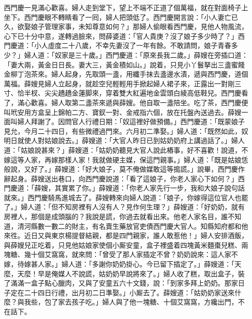 西門慶一見滿心歡喜。婦人走到堂下，望上不端不正道了個萬福，就在對面椅子上坐下。西門慶眼不轉睛看了一囘，婦人把頭低了。西門慶開言說：「小人妻亡已久，欲娶娘子管理家事，未知尊意如何？」那婦人偷眼看西門慶，見他人物風流，心下已十分中意，遂轉過臉來，問薛婆道：「官人貴庚？沒了娘子多少時了？」西門慶道：「小人虛度二十八歲，不幸先妻沒了一年有餘。不敢請問，娘子青春多少？」婦人道：「奴家是三十歲。」西門慶道：「原來長我二歲。」薛嫂在旁插口道：「妻大兩，黃金日日長。妻大三，黃金積如山。」{}說着，只見小丫鬟拏出三盞蜜餞金柳丁泡茶來。婦人起身，先取頭一盞，用纖手抹去盞邊水漬，{}遞與西門慶，道個萬福。薛嫂見婦人立起身，就趁空兒{}輕輕用手掀起婦人裙子來，正露出一對剛三寸、恰半杈、尖尖趫趫金蓮脚來，{}穿着雙大紅遍地金雲頭白綾高低鞋兒。{}西門慶看了，滿心歡喜。婦人取第二盞茶來遞與薛嫂。他自取一盞陪坐。吃了茶，西門慶便叫玳安用方盒呈上錦帕二方、寶釵一對、金戒指六個，放在托盤內送過去。薛嫂一面叫婦人拜謝了。因問官人行禮日期：「奴這裡好做預備。」西門慶道：「既蒙娘子見允，今月二十四日，有些微禮過門來。六月初二準娶。」婦人道：「既然如此，奴明日就使人對姑娘說去。」薛嫂道：「大官人昨日已到姑奶奶府上講過話了。」婦人道：「姑娘說甚來？」薛嫂道：「姑奶奶聽見大官人說此樁事，好不喜歡！說道，不嫁這等人家，再嫁那樣人家！我就做硬主媒，保這門親事。」婦人道：「既是姑娘恁般說，又好了。」{}薛嫂道：「好大娘子，莫不俺做媒敢這等搗謊。」說畢，西門慶作辭起身。薛嫂送出巷口，向西門慶說道：「看了這娘子，你老人家心下如何？」西門慶道：「薛嫂，其實累了你。」{}薛嫂道：「你老人家先行一步，我和大娘子說句話就來。」西門慶騎馬進城去了。薛嫂轉來向婦人說道：「娘子，你嫁得這位官人也罷了。」婦人道：「但不知房裡有人沒有人？{}見作何生理？」薛嫂道：「好奶奶，就有房裡人，那個是成頭腦的？我說是謊，你過去就看出來。{}他老人家名目，誰不知道，清河縣數一數二的財主，有名賣生藥放官吏債西門慶大官人。知縣知府都和他來徃。近日又與東京楊提督結親，都是四門親家，誰人敢惹他！」婦人安排酒飯，與薛嫂兒正吃着，只見他姑娘家使個小厮安童，盒子裡盛着四塊黃米麵棗兒糕、兩塊糖、幾十個艾窩窩，就來問：「曾受了那人家插定不曾？奶奶說來：這人家不嫁，待嫁甚人家。」婦人道：「多謝你奶奶掛心。今已留下插定了。」薛嫂道：「天麼，天麼！早是俺媒人不說謊，姑奶奶早說將來了。」{}婦人收了糕，取出盒子，裝了滿滿一盒子點心臘肉，又與了安童五六十文錢，說：「到家多拜上奶奶。那家日子定在二十四日行禮，出月初二日準娶。」小厮去了。薛嫂道：「姑奶奶家送來什麼？與我些，包了家去孩子吃。」婦人與了他一塊糖、十個艾窩窩，方纔出門，不在話下。

